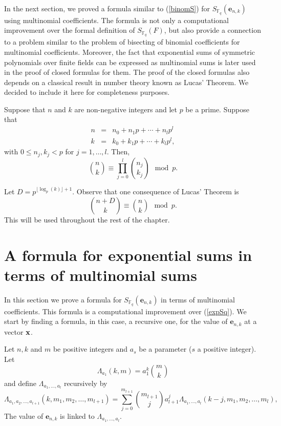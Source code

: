 In the next section, we proved a formula similar to (\ref{binomS}) for $S_{\mathbb{F}_q}(\boldsymbol{e}_{n,k})$ using multinomial coefficients.  The formula is not only a computational improvement over
the formal definition of $S_{\mathbb{F}_q}(F)$, but also provide a connection to a problem similar to the problem of bisecting of binomial coefficients for multinomial coefficients.  Moreover, the fact that
exponential sums of symmetric polynomials over finite fields can be expressed as multinomial sums is later used in the proof of closed formulas for them.  The proof of the closed formulas also depends on
a classical result in number theory known as Lucas' Theorem.  We decided to include it here for completeness purposes.

\begin{theorem}  Suppose that $n$ and $k$ are non-negative integers and let $p$ be a prime.  Suppose that
\begin{eqnarray*}
 n &=& n_0+n_1p+\cdots+n_lp^l\\
 k &=& k_0+k_1p+\cdots+k_lp^l,
\end{eqnarray*}
with $0\leq n_j,k_j <p$ for $j=1,\ldots, l$. Then,
$$\binom{n}{k} \equiv \prod_{j=0}^l\binom{n_j}{k_j}\mod p.$$
\end{theorem}
Let $D=p^{\lfloor\log_p(k)\rfloor+1}$.  Observe that one consequence of Lucas' Theorem is 
\begin{equation}
 \binom{n+D}{k} \equiv \binom{n}{k}\mod p.
\end{equation}
This will be used throughout the rest of the chapter.


\section{A formula for exponential sums in terms of multinomial sums}
\label{multinomialsums}

In this section we prove a formula for $S_{\mathbb{F}_q}(\boldsymbol{e}_{n,k})$ in terms of multinomial coefficients.  This formula is a computational improvement over (\ref{expSq}).  We start by finding
a formula, in this case, a recursive one, for the value of $\boldsymbol{e}_{n,k}$ at a vector ${\bf x}$.  

Let $n, k$ and $m$ be positive integers and $a_s$ be a parameter 
($s$ a positive integer).  Let 
\begin{equation}
\Lambda_{a_1}(k,m)=a_1^k \binom{m}{k} 
\end{equation}
and define $\Lambda_{a_1,\ldots, a_l}$ recursively by
\begin{equation}
 \Lambda_{a_1,a_2,\ldots, a_{l+1}}(k,m_1,m_2,\ldots,m_{l+1})=
 \sum_{j=0}^{m_{l+1}}\binom{m_{l+1}}{j}a_{l+1}^j\Lambda_{a_1,\ldots,a_l}(k-j,m_1,m_2,\ldots,m_{l}),
\end{equation}
The value of $\boldsymbol{e}_{n,k}$ is linked to $\Lambda_{a_1,\ldots, a_l}$.

